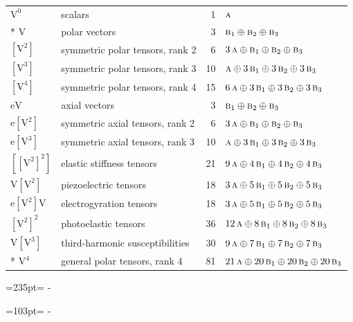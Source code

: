 \documentclass[10pt,a4paper]{article}
\newcommand{\needspace}[1]{\par\penalty-100\begingroup\dimen0=#1\relax\dimen2=\pagegoal
  \advance\dimen2-\pagetotal\ifdim\dimen0>\dimen2\relax\ifdim\dimen2>0pt\vfil\break\fi\fi
  \endgroup}
\numberwithin{equation}{section}
\newcommand{\irr}[1]{\text{\normalfont\scshape #1}}
\newcommand{\jahn}[1]{\mathrm{#1}}
\newlength{\fillwidth}\newlength{\cellwidth}\newlength{\colwidth}
\begin{document}
{\begin{longtable}{@{}llr>{\RaggedRight\arraybackslash}p{\fillwidth}@{}}
\bottomrule\endfoot\endlastfoot
$\jahn{V^{0}}$ & scalars & 1 & $\irr{a}$\\*
$\jahn{V}$ & polar vectors & 3 & $\irr{b}_{1} \oplus\allowbreak \irr{b}_{2} \oplus\allowbreak \irr{b}_{3}$\\
$\jahn{[V^{2}]}$ & symmetric polar tensors, rank 2 & 6 & $3\,\irr{a} \oplus\allowbreak \irr{b}_{1} \oplus\allowbreak \irr{b}_{2} \oplus\allowbreak \irr{b}_{3}$\\
$\jahn{[V^{3}]}$ & symmetric polar tensors, rank 3 & 10 & $\irr{a} \oplus\allowbreak 3\,\irr{b}_{1} \oplus\allowbreak 3\,\irr{b}_{2} \oplus\allowbreak 3\,\irr{b}_{3}$\\
$\jahn{[V^{4}]}$ & symmetric polar tensors, rank 4 & 15 & $6\,\irr{a} \oplus\allowbreak 3\,\irr{b}_{1} \oplus\allowbreak 3\,\irr{b}_{2} \oplus\allowbreak 3\,\irr{b}_{3}$\\
$\jahn{eV}$ & axial vectors & 3 & $\irr{b}_{1} \oplus\allowbreak \irr{b}_{2} \oplus\allowbreak \irr{b}_{3}$\\
$\jahn{e[V^{2}]}$ & symmetric axial tensors, rank 2 & 6 & $3\,\irr{a} \oplus\allowbreak \irr{b}_{1} \oplus\allowbreak \irr{b}_{2} \oplus\allowbreak \irr{b}_{3}$\\
$\jahn{e[V^{3}]}$ & symmetric axial tensors, rank 3 & 10 & $\irr{a} \oplus\allowbreak 3\,\irr{b}_{1} \oplus\allowbreak 3\,\irr{b}_{2} \oplus\allowbreak 3\,\irr{b}_{3}$\\
$\jahn{[[V^{2}]^{2}]}$ & elastic stiffness tensors & 21 & $9\,\irr{a} \oplus\allowbreak 4\,\irr{b}_{1} \oplus\allowbreak 4\,\irr{b}_{2} \oplus\allowbreak 4\,\irr{b}_{3}$\\
$\jahn{V[V^{2}]}$ & piezoelectric tensors & 18 & $3\,\irr{a} \oplus\allowbreak 5\,\irr{b}_{1} \oplus\allowbreak 5\,\irr{b}_{2} \oplus\allowbreak 5\,\irr{b}_{3}$\\
$\jahn{e[V^{2}]V}$ & electrogyration tensors & 18 & $3\,\irr{a} \oplus\allowbreak 5\,\irr{b}_{1} \oplus\allowbreak 5\,\irr{b}_{2} \oplus\allowbreak 5\,\irr{b}_{3}$\\
$\jahn{[V^{2}]^{2}}$ & photoelastic tensors & 36 & $12\,\irr{a} \oplus\allowbreak 8\,\irr{b}_{1} \oplus\allowbreak 8\,\irr{b}_{2} \oplus\allowbreak 8\,\irr{b}_{3}$\\
$\jahn{V[V^{3}]}$ & third-harmonic susceptibilities & 30 & $9\,\irr{a} \oplus\allowbreak 7\,\irr{b}_{1} \oplus\allowbreak 7\,\irr{b}_{2} \oplus\allowbreak 7\,\irr{b}_{3}$\\*
$\jahn{V^{4}}$ & general polar tensors, rank 4 & 81 & $21\,\irr{a} \oplus\allowbreak 20\,\irr{b}_{1} \oplus\allowbreak 20\,\irr{b}_{2} \oplus\allowbreak 20\,\irr{b}_{3}$\\
\bottomrule\end{longtable}}
\needspace{235pt}
\needspace{103pt}
\end{document}
